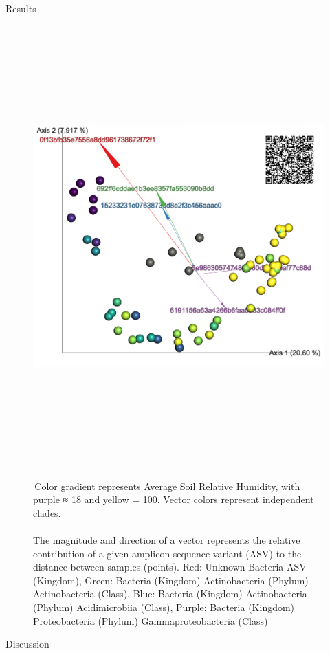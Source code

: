 \documentclass[final]{beamer}
\newlength{\colwidth}
\begin{document}
\begin{frame}[t]
\begin{columns}[t]
\begin{column}{\colwidth}
\begin{block}{Results}
    \begin{figure}[tph!]
      {\includegraphics[height=17cm]{assets/emperor}}
      \caption{\,Color gradient represents Average Soil Relative Humidity, with purple ≈ 18 and yellow = 100. Vector colors represent independent clades. \\ \\The magnitude and direction of a vector represents the relative contribution of a given amplicon sequence variant (ASV) to the distance between samples (points). Red: Unknown Bacteria ASV (Kingdom), Green: Bacteria (Kingdom) Actinobacteria (Phylum) Actinobacteria (Class), Blue: Bacteria (Kingdom) Actinobacteria (Phylum) Acidimicrobiia (Class), Purple: Bacteria (Kingdom) Proteobacteria (Phylum) Gammaproteobacteria (Class)}
      \label{fig:emperor}
    \end{figure}

  \end{block}

  \begin{block}{Discussion}


\end{block}
\end{column}
\end{columns}
\end{frame}
\end{document}
